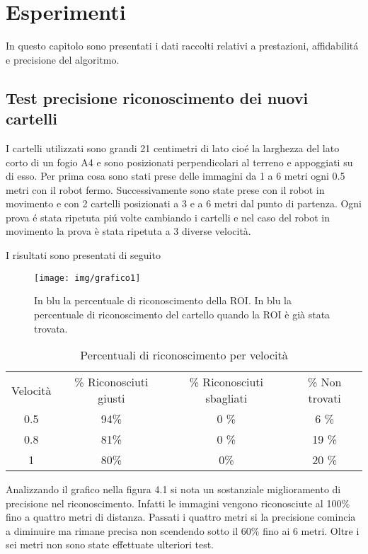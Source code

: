 
\chapter{Esperimenti}
In questo capitolo sono presentati i dati raccolti relativi a prestazioni, affidabilit\'a e precisione del algoritmo.

\section{Test precisione riconoscimento dei nuovi cartelli}
	
	I cartelli utilizzati sono grandi 21 centimetri di lato cio\'e la larghezza del lato corto di un fogio A4 e sono posizionati perpendicolari al terreno e appoggiati su di esso.
	Per prima cosa sono stati prese delle immagini da 1 a 6 metri ogni 0.5 metri con il robot fermo. Successivamente sono state prese con il robot in movimento e con 2 cartelli posizionati a 3 e a 6 metri dal punto di partenza. Ogni prova \'e stata ripetuta pi\'u volte cambiando i cartelli e nel caso del robot in movimento la prova è stata ripetuta a 3 diverse velocità.

	I risultati sono presentati di seguito

	\begin{figure}[!ht]
		\centering
		\texttt{[image: img/grafico1]}
		\caption{In blu la percentuale di riconoscimento della ROI. In blu la percentuale di riconoscimento del cartello quando la ROI è già stata trovata.}
	\end{figure}

	\begin{table}[h]
		\centering
		\begin{tabular}{cccc}
		    Velocità & \% Riconosciuti giusti & \% Riconosciuti sbagliati & \% Non trovati \\
			0.5 &   94\%    & 0 \%		& 6 \%    	\\
			0.8 &   81\%    & 0 \%		& 19 \%		\\
			1 	& 	80\%	& 0\%		& 20 \%		\\
		\end{tabular}
		\caption{Percentuali di riconoscimento per velocità}
	\end{table}

	Analizzando il grafico nella figura 4.1 si nota un sostanziale miglioramento di precisione nel riconoscimento. Infatti le immagini vengono riconosciute al 100\% fino a quattro metri di distanza. Passati i quattro metri si la precisione comincia a diminuire ma rimane precisa non scendendo sotto il 60\% fino ai 6 metri. Oltre i sei metri non sono state effettuate ulteriori test.

